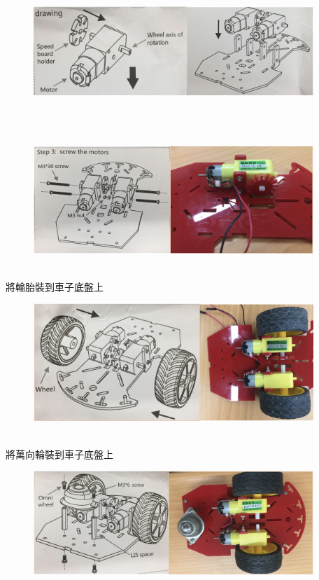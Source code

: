 \documentclass{article}
\begin{document}
\\
\\
\begin{figure}[htp]
    \begin{center}
        \includegraphics[width=300pt]{pic/1_1_14.png}
    \end{center}
\end{figure}
\\
\\
\begin{figure}[htp]
    \begin{center}
        \includegraphics[width=300pt]{pic/1_1_15.png}
    \end{center}
\end{figure}
\\
將輪胎裝到車子底盤上
\\
\begin{figure}[htp]
    \begin{center}
        \includegraphics[width=300pt]{pic/1_1_16.png}
    \end{center}
\end{figure}
\\
將萬向輪裝到車子底盤上
\\
\begin{figure}[htp]
    \begin{center}
        \includegraphics[width=300pt]{pic/1_1_17.png}
    \end{center}
\end{figure}
\end{document}
